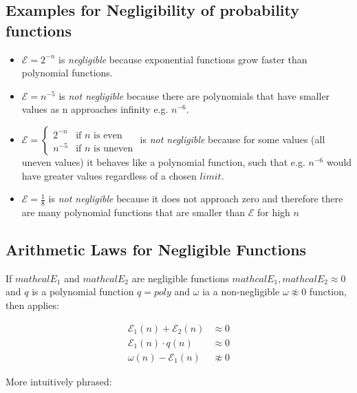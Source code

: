\subsection*{Examples for Negligibility of probability functions}

\begin{itemize}
    \item $\mathcal{E} = 2^{-n}$ is \textit{negligible} because exponential functions grow faster than polynomial functions.
    \item $\mathcal{E} = n^{-5}$ is \textit{not negligible} because there are polynomials that have smaller values as n approaches infinity e.g. $n^{-6}$.
    \item $\mathcal{E} = \begin{cases}
                  2^{-n} & \text{if $n$ is even}   \\
                  n^{-5} & \text{if $n$ is uneven}
              \end{cases}$
          is \textit{not negligible} because for some values (all uneven values) it behaves like a polynomial function, such that e.g. $n^{-6}$ would have greater values regardless of a chosen $limit$.
    \item $\mathcal{E} = \frac{1}{8}$ is \textit{not negligible} because it does not approach zero and therefore there are many polynomial functions that are smaller than $\mathcal{E}$ for high $n$
\end{itemize}

\subsection*{Arithmetic Laws for Negligible Functions}

If $mathcal{E}_{1}$ and $mathcal{E}_{2}$ are negligible functions $mathcal{E}_{1}, mathcal{E}_{2} \approx 0$ and $q$ is a polynomial function $q = poly$ and $\omega$ ia a non-negligible $\omega \not\approx 0$ function, then applies:

\begin{align}
    \mathcal{E}_{1}(n) + \mathcal{E}_{2}(n) & \approx 0     \label{eq:neglig_1}        \\
    \mathcal{E}_{1}(n) \cdot q(n)           & \approx 0            \label{eq:neglig_2} \\
    \omega(n) - \mathcal{E}_{1}(n)          & \not\approx 0 \label{eq:neglig_3}
\end{align}

More intuitively phrased:

